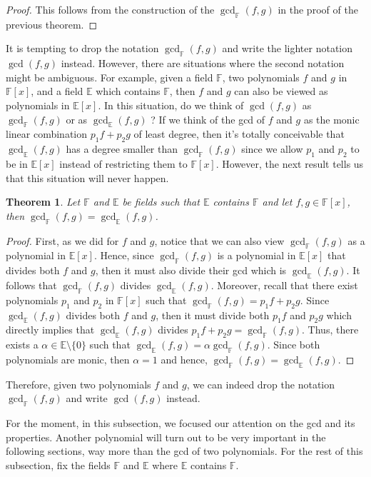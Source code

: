 \documentclass{article}
\theoremstyle{plain}
\newtheorem{theorem}{Theorem}[subsection]
\theoremstyle{definition}
\newcommand{\F}{\mathbb{F}}
\newcommand{\E}{\mathbb{E}}
\begin{document}
\begin{proof}
    This follows from the construction of the $\gcd_{\F}(f,g)$ in the proof of the previous theorem.
\end{proof}

It is tempting to drop the notation $\gcd_{\F}(f,g)$ and write the lighter notation $\gcd(f,g)$ instead. However, there are situations where the second notation might be ambiguous. For example, given a field $\F$, two polynomials $f$ and $g$ in $\F[x]$, and a field $\E$ which contains $\F$, then $f$ and $g$ can also be viewed as polynomials in $\E[x]$. In this situation, do we think of $\gcd(f,g)$ as $\gcd_{\F}(f,g)$ or as $\gcd_{\E}(f,g)$ ? If we think of the gcd of $f$ and $g$ as the monic linear combination $p_1 f + p_2 g$ of least degree, then it's totally conceivable that $\gcd_{\E}(f,g)$ has a degree smaller than $\gcd_{\F}(f,g)$ since we allow $p_1$ and $p_2$ to be in $\E[x]$ instead of restricting them to $\F[x]$. However, the next result tells us that this situation will never happen. 

\begin{theorem}
\label{gcd of different fields are equal}
    Let $\F$ and $\E$ be fields such that $\E$ contains $\F$ and let $f,g \in \F[x]$, then $\gcd_{\F}(f,g) = \gcd_{\E}(f,g)$.
\end{theorem}

\begin{proof}
    First, as we did for $f$ and $g$, notice that we can also view $\gcd_{\F}(f,g)$ as a polynomial in $\E[x]$. Hence, since $\gcd_{\F}(f,g)$ is a polynomial in $\E[x]$ that divides both $f$ and $g$, then it must also divide their gcd which is $\gcd_{\E}(f,g)$. It follows that $\gcd_{\F}(f,g)$ divides $\gcd_{\E}(f,g)$. Moreover, recall that there exist polynomials  $p_1$ and $p_2$ in $\F[x]$ such that $\gcd_{\F}(f,g) = p_1 f + p_2 g$. Since $\gcd_{\E}(f,g)$ divides both $f$ and $g$, then it must divide both $p_1 f$ and $p_2 g$ which directly implies that $\gcd_{\E}(f,g)$ divides $p_1 f + p_2 g = \gcd_{\F}(f,g)$. Thus, there exists a $\alpha \in \E \setminus \{0\}$ such that $\gcd_{\E}(f,g) = \alpha \gcd_{\F}(f,g)$. Since both polynomials are monic, then $\alpha = 1$ and hence, $\gcd_{\F}(f,g) = \gcd_{\E}(f,g)$. 
\end{proof}

Therefore, given two polynomials $f$ and $g$, we can indeed drop the notation $\gcd_{\F}(f,g)$ and write $\gcd(f,g)$ instead. 

For the moment, in this subsection, we focused our attention on the gcd and its properties. Another polynomial will turn out to be very important in the following sections, way more than the gcd of two polynomials. For the rest of this subsection, fix the fields $\F$ and $\E$ where $\E$ contains $\F$.
\end{document}
